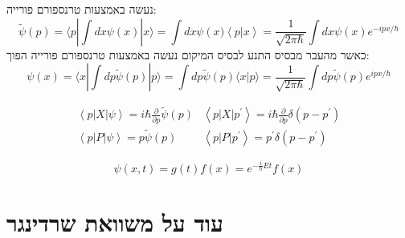 \documentclass{tstextbook}
\begin{document}
\begin{proposition}
נעשה באמצעות טרנספורם פורייה:
$$\widetilde{\psi}(p)=\langle p|\int d x\psi(x)|x  \rangle =\int d x\psi\left(x)\left\langle p\right|x\right\rangle=\frac{1}{\sqrt{2\pi\hbar}}\int d x\psi\left(x\right)e^{-i p x/\hbar}$$
כאשר מהעבר מבסיס התנע לבסיס המיקום נעשה באמצעות טרנספורם פורייה הפוך:
$$\psi(x)=\langle x|\int d p\widetilde{\psi}(p)|p\rangle=\int d p\widetilde{\psi}(p) \langle x|p\rangle=\frac{1}{\sqrt{2\pi\hbar}}\int d p\widetilde{\psi}(p)e^{i p x/\hbar}$$

\end{proposition}
\begin{proposition}
\begin{gather*}\left\langle  p|X|\psi \right\rangle=i\hbar{\frac{\partial}{\partial p}}\tilde{\psi}(p)&\left\langle  p|X|p^{\prime} \right\rangle=i\hbar{\frac{\partial}{\partial p}}\delta\left( p-p^{\prime} \right)\\ \left\langle  p|P|\psi \right\rangle=p\tilde{\psi}(p)& \left\langle  p|P|p^{\prime} \right\rangle=p^{\prime}\delta\left( p-p^{\prime} \right) 
\end{gather*}

\end{proposition}
\begin{proposition}
$$\psi(x,t)=g(t)f(x)=e^{-{\frac{i}{\hbar}}E t}f(x)$$

\end{proposition}

\section{עוד על משוואת שרדינגר}
\end{document}
